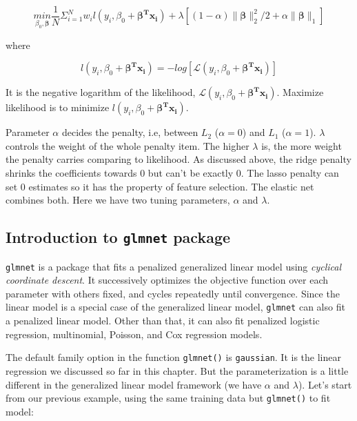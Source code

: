 \documentclass[
  12pt,
]{krantz}
\begin{document}
\[\underset{\beta_{0},\symbf{\beta}}{min}\frac{1}{N}\Sigma_{i=1}^{N}w_{i}l(y_{i},\beta_{0}+\symbf{\beta^{T}x_{i}})+\lambda[(1-\alpha)\parallel\symbf{\beta}\parallel_{2}^{2}/2+\alpha\parallel\symbf{\beta}\parallel_{1}]\]

where

\[l(y_{i},\beta_{0}+\symbf{\beta^{T}x_{i}})=-log[\mathcal{L}(y_{i},\beta_{0}+\symbf{\beta^{T}x_{i}})]\]

It is the negative logarithm of the likelihood, \(\mathcal{L}(y_{i},\beta_{0}+\symbf{\beta^{T}x_{i}})\). Maximize likelihood is to minimize \(l(y_{i},\beta_{0}+\symbf{\beta^{T}x_{i}})\).

Parameter \(\alpha\) decides the penalty, i.e, between \(L_2\) (\(\alpha=0\)) and \(L_1\) (\(\alpha=1\)). \(\lambda\) controls the weight of the whole penalty item. The higher \(\lambda\) is, the more weight the penalty carries comparing to likelihood. As discussed above, the ridge penalty shrinks the coefficients towards 0 but can't be exactly 0. The lasso penalty can set 0 estimates so it has the property of feature selection. The elastic net combines both. Here we have two tuning parameters, \(\alpha\) and \(\lambda\).

\hypertarget{introduction-to-glmnet-package}{%
\subsection{\texorpdfstring{Introduction to \texttt{glmnet} package}{Introduction to glmnet package}}\label{introduction-to-glmnet-package}}

\texttt{glmnet} is a package that fits a penalized generalized linear model using \emph{cyclical coordinate descent}. It successively optimizes the objective function over each parameter with others fixed, and cycles repeatedly until convergence. Since the linear model is a special case of the generalized linear model, \texttt{glmnet} can also fit a penalized linear model. Other than that, it can also fit penalized logistic regression, multinomial, Poisson, and Cox regression models.

The default family option in the function \texttt{glmnet()} is \texttt{gaussian}. It is the linear regression we discussed so far in this chapter. But the parameterization is a little different in the generalized linear model framework (we have \(\alpha\) and \(\lambda\)). Let's start from our previous example, using the same training data but \texttt{glmnet()} to fit model:
\end{document}
